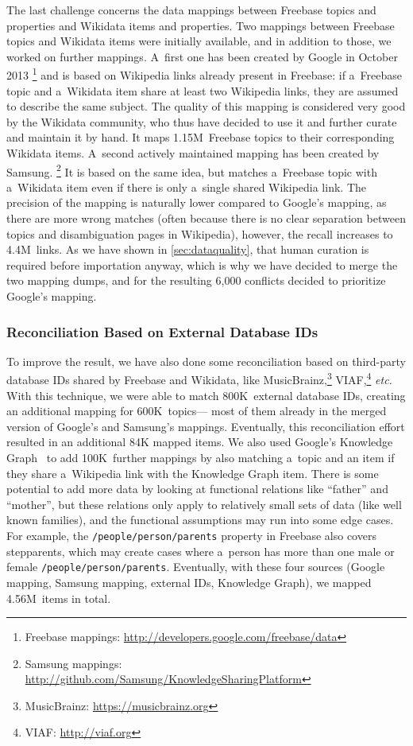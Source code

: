 \documentclass{acm_proc_article-sp}
\begin{document}
The last challenge concerns the data mappings between Freebase topics and properties
and Wikidata items and properties.
Two mappings between Freebase topics and Wikidata items were initially available,
and in addition to those, we worked on further mappings.
A~first one has been created by Google in October 2013%
\footnote{Freebase mappings: \url{http://developers.google.com/freebase/data}}
and is based on Wikipedia links already present in Freebase: if a~Freebase topic and
a~Wikidata item share at least two Wikipedia links, they are assumed to describe the same subject.
The quality of this mapping is considered very good by the Wikidata community,
who thus have decided to use it and further curate and maintain it by hand.
It maps 1.15M~Freebase topics to their corresponding Wikidata items.
A~second actively maintained mapping has been created by Samsung.%
\footnote{Samsung mappings: \url{http://github.com/Samsung/KnowledgeSharingPlatform}}
It is based on the same idea, but matches a~Freebase topic with a~Wikidata item
even if there is only a~single shared Wikipedia link.
The precision of the mapping is naturally lower compared to Google's mapping,
as there are more wrong matches (often because there is no clear separation between topics
and disambiguation pages in Wikipedia), however, the recall increases to 4.4M~links.
As we have shown in \autoref{sec:dataquality},
that human curation is required before importation anyway,
which is why we have decided to merge the two mapping dumps,
and for the resulting 6,000 conflicts decided to prioritize Google's mapping.

\subsubsection{Reconciliation Based on External Database IDs}

To improve the result, we have also done some reconciliation based on third-party database IDs
shared by Freebase and Wikidata, like MusicBrainz,\footnote{MusicBrainz: \url{https://musicbrainz.org}}
VIAF,\footnote{VIAF: \url{http://viaf.org}} \emph{etc.}
With this technique, we were able to match 800K~external database IDs,
creating an additional mapping for 600K~topics---%
most of them already in the merged version of Google's and Samsung's mappings.
Eventually, this reconciliation effort resulted in an additional 84K mapped items.
We also used Google's Knowledge Graph~\cite{singhal2012} to add 100K~further mappings
by also matching a~topic and an item if they share a~Wikipedia link with the Knowledge Graph item.
There is some potential to add more data by looking at functional relations
like ``father'' and ``mother'', but these relations only apply to relatively small sets of data
(like well known families), and the functional assumptions may run into some edge cases.
For example, the \texttt{/people/person/parents} property in Freebase also covers stepparents,
which may create cases where a~person has more than one male or female \texttt{/people/person/parents}.
Eventually, with these four sources (Google mapping, Samsung mapping, external IDs, Knowledge Graph),
we mapped 4.56M~items in total.
\end{document}
